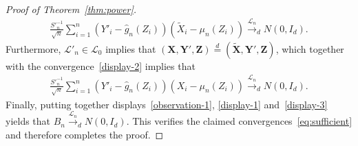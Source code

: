 \documentclass[12pt]{article}
\theoremstyle{definition}
\theoremstyle{remark}
\newcommand{\prx}{\bm X}
\newcommand{\srx}{X}
\newcommand{\prz}{\bm Z}
\newcommand{\srz}{Z}
\newcommand{\prxk}{{{\widetilde{\bm X}}}}
\newcommand{\srxk}{\widetilde X}
\newcommand{\pry}{{\bm Y}}
\begin{document}
\begin{proof}[Proof of Theorem~\ref{thm:power}]
\begin{equation}
		\begin{split}
			\frac{S'^{-1}_n}{\sqrt{n}}\sum_{i = 1}^n (Y'_i - \widehat g_n(Z_i))(\srxk_i - \mu_n(\srz_i)) \overset{\mathcal L_n}\rightarrow_d N(0, I_d).
			\label{display-2}
		\end{split}
	\end{equation}
	Furthermore, $\mathcal L'_n \in \mathscr L_0$ implies that $(\prx, \pry', \prz) \overset d = (\prxk, \pry', \prz)$, which together with the convergence~\eqref{display-2} implies that
	\begin{equation}
		\begin{split}
			\frac{S'^{-1}_n}{\sqrt{n}}\sum_{i = 1}^n (Y'_i - \widehat g_n(Z_i))(\srx_i - \mu_n(\srz_i)) \overset{\mathcal L_n}\rightarrow_d N(0, I_d).
			\label{display-3}
		\end{split}
	\end{equation}
	Finally, putting together displays~\eqref{observation-1}, \eqref{display-1} and~\eqref{display-3} yields that $B_n \overset{\mathcal L_n}\rightarrow_d N(0, I_d)$. This verifies the claimed convergences~\eqref{eq:sufficient} and therefore completes the proof.
\end{proof}
\end{document}
